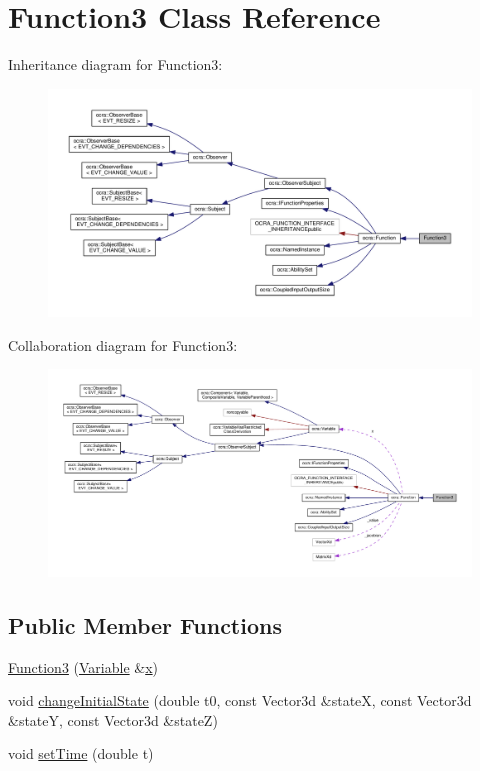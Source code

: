 \hypertarget{classFunction3}{}\section{Function3 Class Reference}
\label{classFunction3}


Inheritance diagram for Function3\+:
\nopagebreak
\begin{figure}[H]
\begin{center}
\leavevmode
\includegraphics[width=350pt]{d0/dce/classFunction3__inherit__graph}
\end{center}
\end{figure}


Collaboration diagram for Function3\+:
\nopagebreak
\begin{figure}[H]
\begin{center}
\leavevmode
\includegraphics[width=350pt]{df/d1b/classFunction3__coll__graph}
\end{center}
\end{figure}
\subsection*{Public Member Functions}
\begin{DoxyCompactItemize}
\item 
\hyperlink{classFunction3_a57fce7c38791ee3c72951a4d0ac510e5}{Function3} (\hyperlink{classocra_1_1Variable}{Variable} \&\hyperlink{classocra_1_1Function_a28825886d1f149c87b112ec2ec1dd486}{x})
\item 
void \hyperlink{classFunction3_a239a319d61236aa9b9375a595bf2beb9}{change\+Initial\+State} (double t0, const Vector3d \&stateX, const Vector3d \&stateY, const Vector3d \&stateZ)
\item 
void \hyperlink{classFunction3_ade56597de44f5cdd047aa9aa9e29a129}{set\+Time} (double t)
\end{DoxyCompactItemize}
